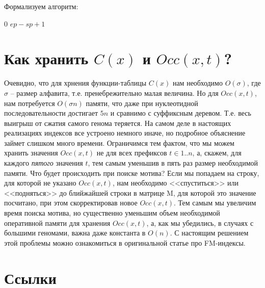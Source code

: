 \documentclass[letterpaper, 11pt]{article}
\begin{document}
Формализуем алгоритм:
\begin{algorithmic}[1]
\item[] 


\item[]

\EndWhile

\item []

\State \Return $0$
\Else
\State \Return $ep - sp + 1$
\EndIf

\EndProcedure
\end{algorithmic}

\section{Как хранить $C(x)$ и $Occ(x, t)$?}

Очевидно, что для хрнения функции-таблицы $C(x)$ нам необходимо $O(\sigma)$, где $\sigma$ -- размер алфавита, т.е. пренебрежительно малая величина. Но для $Occ(x, t)$, нам потребуется $O(\sigma n)$ памяти, что даже при нуклеотидной последовательности достигает $5n$ и сравнимо с суффиксным деревом. Т.е. весь выигрыш от сжатия самого генома теряется. На самом деле в настоящих реализациях индексов все устроено немного иначе, но подробное объяснение займет слишком много времени. Ограничимся тем фактом, что мы можем хранить значения $Occ(x, t)$ не для всех префиксов $t \in 1..n$, а, скажем, для каждого \textit{пятого} значения $t$, тем самым уменьшив в пять раз размер необходимой памяти. Что будет происходить при поиске мотива? Если мы попадаем на строку, для которой не указано $Occ(x, t)$, нам необходимо <<спуститься>> или <<подняться>> до блийжайшей строки в матрице M, для которой это значение посчитано, при этом скорректировав новое $Occ(x, t)$. Тем самым мы увеличим время поиска мотива, но существенно уменьшим объем необходимой оперативной памяти для хранения $Occ(x, t)$, а, как мы убедились, в случаях с большими геномами, важна даже константа в $O(n)$. С настоящим решением этой проблемы можно ознакомиться в оригинальной статье про FM-индексы\cite{FM}.

\section{Ссылки}
\end{document}
